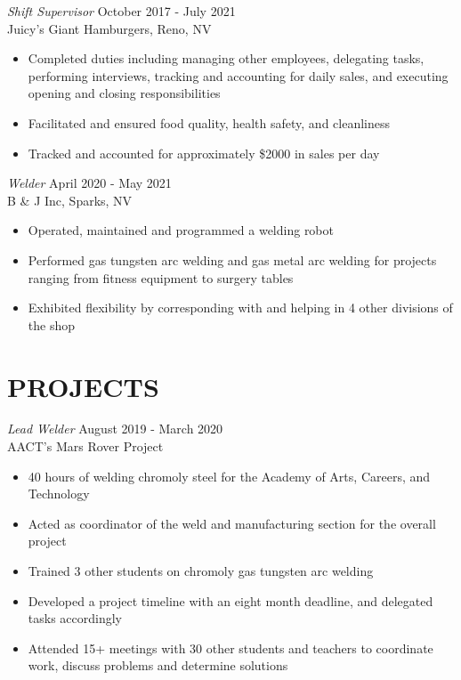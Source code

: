 \documentclass[margin, 10pt]{res}
\begin{document}
\begin{resume}
{\sl Shift Supervisor} \hfill October 2017 - July 2021 \\
Juicy's Giant Hamburgers, Reno, NV
\begin{itemize}
\item Completed duties including managing other employees, delegating tasks, performing interviews, tracking and accounting for daily sales, and executing opening and closing responsibilities
\item Facilitated and ensured food quality, health safety, and cleanliness
\item Tracked and accounted for approximately \$2000 in sales per day
\end{itemize} 

{\sl  Welder} \hfill April 2020 - May 2021 \\
B \& J Inc, Sparks, NV
\begin{itemize}
	\item Operated, maintained and programmed a welding robot
	\item Performed gas tungsten arc welding and gas metal arc welding for projects ranging from fitness equipment to surgery tables
	\item Exhibited flexibility by corresponding with and helping in 4 other divisions of the shop
\end{itemize}

\section{PROJECTS}
{\sl Lead Welder} \hfill August 2019 - March 2020 \\
AACT's Mars Rover Project
\begin{itemize}
	\item 40 hours of welding chromoly steel for the Academy of Arts, Careers, and Technology
	\item Acted as coordinator of the weld and manufacturing section for the overall project
	\item Trained 3 other students on chromoly gas tungsten arc welding
	\item Developed a project timeline with an eight month deadline, and delegated tasks accordingly
	\item Attended 15+ meetings with 30 other students and teachers to coordinate work, discuss problems and determine solutions
\end{itemize}


\end{resume}
\end{document}
